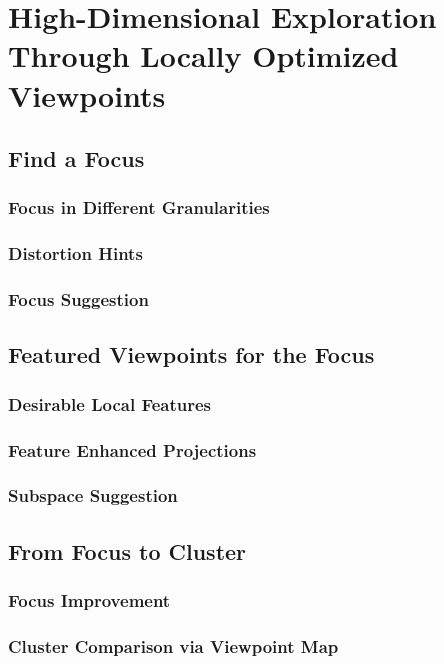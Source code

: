 \section{High-Dimensional Exploration Through Locally Optimized Viewpoints}
\subsection{Find a Focus}
\subsubsection{Focus in Different Granularities}
\subsubsection{Distortion Hints}
\subsubsection{Focus Suggestion}
\subsection{Featured Viewpoints for the Focus}
\subsubsection{Desirable Local Features}
\subsubsection{Feature Enhanced Projections}
\subsubsection{Subspace Suggestion}
\subsection{From Focus to Cluster}
\subsubsection{Focus Improvement}
\subsubsection{Cluster Comparison via Viewpoint Map}
